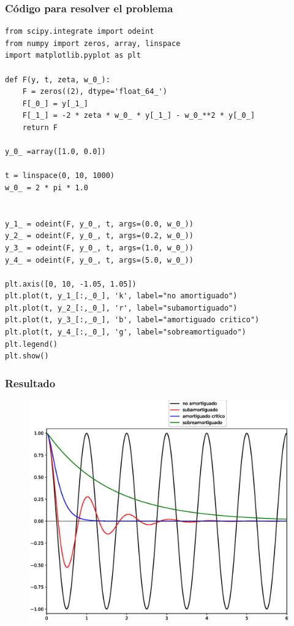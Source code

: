 \begin{frame}
\frametitle{Código para resolver el problema}
\begin{lstlisting}[caption=Código completo, style=FormattedNumber, basicstyle=\linespread{1.1}\ttfamily=\small, columns=fullflexible]
from scipy.integrate import odeint
from numpy import zeros, array, linspace
import matplotlib.pyplot as plt

def F(y, t, zeta, w_0_):
    F = zeros((2), dtype='float_64_')
    F[_0_] = y[_1_]
    F[_1_] = -2 * zeta * w_0_ * y[_1_] - w_0_**2 * y[_0_]
    return F    

y_0_ =array([1.0, 0.0])

t = linspace(0, 10, 1000)
w_0_ = 2 * pi * 1.0


y_1_ = odeint(F, y_0_, t, args=(0.0, w_0_))
y_2_ = odeint(F, y_0_, t, args=(0.2, w_0_))
y_3_ = odeint(F, y_0_, t, args=(1.0, w_0_))
y_4_ = odeint(F, y_0_, t, args=(5.0, w_0_))

plt.axis([0, 10, -1.05, 1.05])
plt.plot(t, y_1_[:,_0_], 'k', label="no amortiguado")
plt.plot(t, y_2_[:,_0_], 'r', label="subamortiguado")
plt.plot(t, y_3_[:,_0_], 'b', label="amortiguado critico")
plt.plot(t, y_4_[:,_0_], 'g', label="sobreamortiguado")
plt.legend()
plt.show()
\end{lstlisting}
\end{frame}
\begin{frame}[plain]
\frametitle{Resultado}
\begin{figure}
    \centering
    \includegraphics[scale=0.4]{Imagenes/sol_odeint_03.eps} 
\end{figure}
\end{frame}
